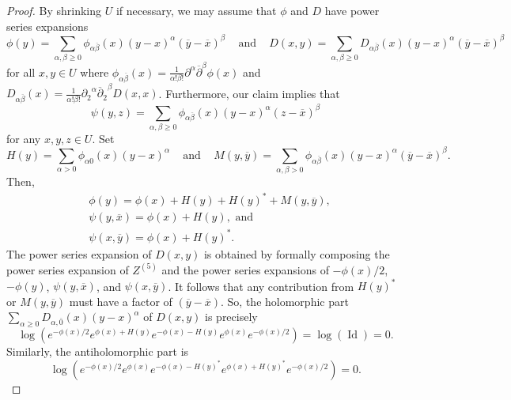\documentclass{amsart}
\theoremstyle{definition}
\theoremstyle{remark}
\numberwithin{equation}{section}
\DeclareMathOperator{\Id}{Id}
\begin{document}
\begin{proof}
By shrinking $U$ if necessary, we may assume that $\phi$ and $D$ have power series expansions
\begin{equation*}
\phi(y) = \sum_{\alpha,\beta \geq 0} \phi_{\alpha \overline{\beta}}(x) (y-x)^\alpha (\overline{y} - \overline{x})^\beta \hspace{10pt} \text{ and } \hspace{10pt} D(x,y) = \sum_{\alpha,\beta \geq 0} D_{\alpha \overline{\beta}}(x) (y-x)^\alpha (\overline{y} - \overline{x})^\beta
\end{equation*}
for all $x,y \in U$ where $\phi_{\alpha\overline{\beta}}(x) = \frac{1}{\alpha! \beta!} \partial^\alpha \overline{\partial}^\beta \phi(x)$ and $D_{\alpha\overline{\beta}}(x) = \frac{1}{\alpha! \beta!} {\partial_2}^\alpha {\overline{\partial}_2}^\beta D(x,x)$. Furthermore, our claim implies that
\begin{equation*}
\psi(y,z) = \sum_{\alpha,\beta \geq 0} \phi_{\alpha \overline{\beta}}(x) (y-x)^\alpha (z - \overline{x})^\beta
\end{equation*}
for any $x,y,z \in U$. Set
$$
H(y)= \sum_{\alpha > 0} \phi_{\alpha0}(x) (y-x)^\alpha \hspace{10pt} \text{ and } \hspace{10pt} 
M(y,\overline{y}) = \sum_{\alpha,\beta > 0} \phi_{\alpha \overline{\beta}}(x) (y-x)^\alpha (\overline{y} - \overline{x})^\beta. 
$$
Then,
\begin{align*}
& \phi(y) = \phi(x) + H(y) + H(y)^* + M(y,\overline{y}), \\
& \psi(y,\overline{x}) = \phi(x) + H(y), \text{ and } \\
& \psi(x,\overline{y}) = \phi(x) + H(y)^*.
\end{align*}
The power series expansion of $D(x,y)$ is obtained by formally composing the power series expansion of $Z^{(5)}$ and the power series expansions of $-\phi(x)/2$, $-\phi(y)$, $\psi(y,\overline{x})$, and $\psi(x,\overline{y})$. It follows that any contribution from $H(y)^*$ or $M(y,\overline{y})$ must have a factor of $(\overline{y}-\overline{x})$. So, the holomorphic part $\sum_{\alpha \geq 0} D_{\alpha,\overline{0}}(x)(y-x)^\alpha$ of $D(x,y)$ is precisely
$$
\log \left ( e^{-\phi(x)/2} e^{\phi(x) + H(y)}e^{-\phi(x) - H(y)}e^{\phi(x)}e^{-\phi(x)/2} \right ) = \log(\Id) = 0.
$$
Similarly, the antiholomorphic part is
$$
\log \left (  e^{-\phi(x)/2} e^{\phi(x)} e^{-\phi(x) - H(y)^*} e^{\phi(x) + H(y)^*} e^{-\phi(x)/2} \right ) = 0.
$$

\end{proof}
\end{document}
